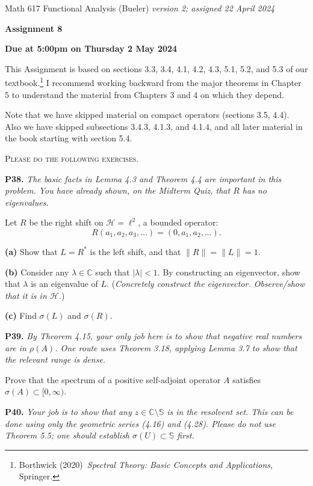 \documentclass[12pt]{amsart}
\newcommand{\cH}{\mathcal{H}}
\newcommand{\CC}{\mathbb{C}}
\newcommand{\prob}[1]{\bigskip\noindent\textbf{#1.}\quad }
\newcommand{\epart}[1]{\medskip\noindent\textbf{(#1)}\quad }
\begin{document}
\scriptsize \noindent Math 617 Functional Analysis (Bueler) \hfill \emph{version 2; assigned 22 April 2024}
\normalsize\medskip

\Large\centerline{\textbf{Assignment 8}}
\large
\medskip

\centerline{\textbf{Due at 5:00pm on Thursday 2 May 2024}}
\medskip
\normalsize

\thispagestyle{empty}

\bigskip
\noindent This Assignment is based on sections 3.3, 3.4, 4.1, 4.2, 4.3, 5.1, 5.2, and 5.3 of our textbook.\footnote{Borthwick (2020)~\emph{Spectral Theory: Basic Concepts and Applications}, Springer.}  I recommend working backward from the major theorems in Chapter 5 to understand the material from Chapters 3 and 4 on which they depend.

\bigskip
\noindent Note that we have skipped material on compact operators (sections 3.5, 4.4).  Also we have skipped subsections 3.4.3, 4.1.3, and 4.1.4, and all later material in the book starting with section 5.4.

\medskip
\noindent \textsc{Please do the following exercises.}
\smallskip

\renewcommand{\SS}{\mathbb{S}}


\prob{P38}  \emph{The basic facts in Lemma 4.3 and Theorem 4.4 are important in this problem.  You have already shown, on the Midterm Quiz, that $R$ has no eigenvalues.}

\medskip\noindent Let $R$ be the right shift on $\cH=\ell^2$, a bounded operator:
	$$R (a_1,a_2,a_3,\dots) = (0,a_1,a_2,\dots).$$

\epart{a}  Show that $L=R^*$ is the left shift, and that $\|R\|=\|L\|=1$.

\epart{b}  Consider any $\lambda\in\CC$ such that $|\lambda|<1$.  By constructing an eigenvector, show that $\lambda$ is an eigenvalue of $L$.  (\emph{Concretely construct the eigenvector.  Observe/show that it is in $\cH$.})

\epart{c}  Find $\sigma(L)$ and $\sigma(R)$.


\prob{P39}  \emph{By Theorem 4.15, your only job here is to show that negative real numbers are in $\rho(A)$.  One route uses Theorem 3.18, applying Lemma 3.7 to show that the relevant range is dense.}

\medskip\noindent Prove that the spectrum of a positive self-adjoint operator $A$ satisfies $\sigma(A) \subset [0,\infty)$.


\prob{P40}  \emph{Your job is to show that any $z\in\CC\setminus \SS$ is in the resolvent set.  This can be done using only the geometric series (4.16) and (4.28).  Please do not use Theorem 5.5; one should establish $\sigma(U) \subset \SS$ first.}
\end{document}
